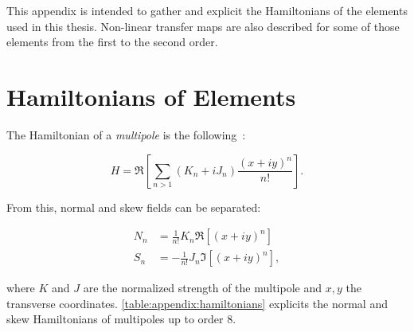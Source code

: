 This appendix is intended to gather and explicit the Hamiltonians of the elements used in this 
thesis. Non-linear transfer maps are also described for some of those elements from the first to
the second order.

\section{Hamiltonians of Elements}

The Hamiltonian of a \textit{multipole} is the
following~\cite{keintzel_jacqueline_beam_nodate,tomas_direct_2003,franchi_studies_2006}:

\begin{equation}
    H = \Re \left[ \sum_{n>1} (K_n + iJ_n) \frac{(x+iy)^n}{n!} \right].
    \label{eq:appendix:transfer_maps:hamiltonian}
\end{equation}

From this, normal and skew fields can be separated:

\begin{equation}
    \begin{aligned}
        N_n &= \frac{1}{n!} K_n \Re \left[ (x+iy)^n \right] \\
        S_n &= -\frac{1}{n!} J_n \Im \left[ (x+iy)^n \right],
    \end{aligned}
\end{equation}

where $K$ and $J$ are the normalized strength of the multipole and $x,y$ the transverse coordinates.
\cref{table:appendix:hamiltonians} explicits the normal and skew Hamiltonians of multipoles up to
order 8.

